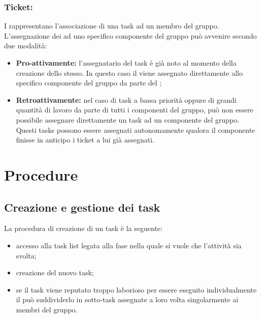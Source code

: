 \documentclass[NormeDiProgetto.tex]{subfiles}
\begin{document}
	\subsubsection{Ticket:}
	I  rappresentano l'associazione di una task ad un membro del gruppo.
	L'assegnazione dei  ad uno specifico componente del gruppo può avvenire secondo due modalità:
	\begin{itemize}
		\item \textbf{Pro-attivamente:} l'assegnatario del task è già noto al momento della creazione dello stesso. In questo caso il  viene assegnato direttamente allo specifico componente del gruppo da parte del \respdiprog; 
		\item \textbf{Retroattivamente:} nel caso di task a bassa priorità oppure di grandi quantità di lavoro da parte di tutti i componenti del gruppo, può non essere possibile assegnare direttamente un task ad un componente del gruppo. Questi tasks possono essere assegnati autonomamente qualora il componente finisse in anticipo i ticket a lui già assegnati.
	\end{itemize}
	
	\section{Procedure}
	\subsection{Creazione e gestione dei task}	
	La procedura di creazione di un task è la seguente:
	\begin{itemize}
		\item accesso alla task list legata alla fase nella quale si vuole che l'attività sia svolta;
		\item creazione del nuovo task;
		\item se il task viene reputato troppo laborioso per essere eseguito individualmente il \respdiprog{} può suddividerlo in sotto-task assegnate a loro volta singolarmente ai membri del gruppo.	
	\end{itemize}		
	
\end{document}
